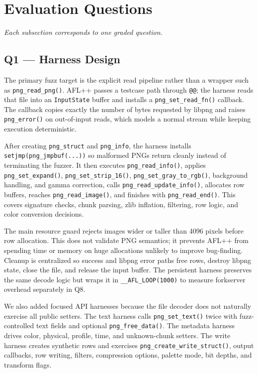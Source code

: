 \documentclass[letterpaper,twocolumn,10pt]{article}
\begin{document}
\section{Evaluation Questions}
\noindent\textit{Each subsection corresponds to one graded question.}

\subsection{Q1 --- Harness Design}
The primary fuzz target is the explicit read pipeline rather than a wrapper
such as \texttt{png\_read\_png()}. AFL++ passes a testcase path through
\texttt{@@}; the harness reads that file into an \texttt{InputState} buffer and
installs a \texttt{png\_set\_read\_fn()} callback. The callback copies exactly
the number of bytes requested by libpng and raises \texttt{png\_error()} on
out-of-input reads, which models a normal stream while keeping execution
deterministic.

After creating \texttt{png\_struct} and \texttt{png\_info}, the harness installs
\texttt{setjmp(png\_jmpbuf(...))} so malformed PNGs return cleanly instead of
terminating the fuzzer. It then executes \texttt{png\_read\_info()}, applies
\texttt{png\_set\_expand()}, \texttt{png\_set\_strip\_16()},
\texttt{png\_set\_gray\_to\_rgb()}, background handling, and gamma correction,
calls \texttt{png\_read\_update\_info()}, allocates row buffers, reaches
\texttt{png\_read\_image()}, and finishes with \texttt{png\_read\_end()}. This
covers signature checks, chunk parsing, zlib inflation, filtering, row logic,
and color conversion decisions.

The main resource guard rejects images wider or taller than 4096 pixels before
row allocation. This does not validate PNG semantics; it prevents AFL++ from
spending time or memory on huge allocations unlikely to improve bug-finding.
Cleanup is centralized so success and libpng error paths free rows, destroy
libpng state, close the file, and release the input buffer. The persistent
harness preserves the same decode logic but wraps it in \texttt{\_\_AFL\_LOOP(1000)}
to measure forkserver overhead separately in Q8.

We also added focused API harnesses because the file decoder does not naturally
exercise all public setters. The text harness calls \texttt{png\_set\_text()}
twice with fuzz-controlled text fields and optional \texttt{png\_free\_data()}.
The metadata harness drives color, physical, profile, time, and unknown-chunk
setters. The write harness creates synthetic rows and exercises
\texttt{png\_create\_write\_struct()}, output callbacks, row writing, filters,
compression options, palette mode, bit depths, and transform flags.
\end{document}
